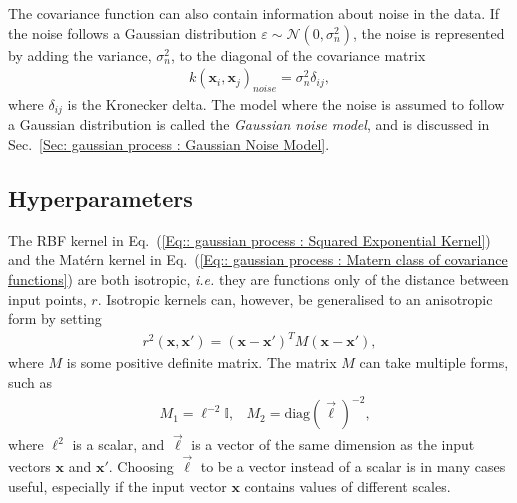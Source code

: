\documentclass[twoside,english]{uiofysmaster}
\begin{document}
{{The covariance function can also contain information about noise in the data. If the noise follows a Gaussian distribution $\varepsilon \sim \mathcal{N}(0, \sigma_n^2)$, the noise is represented by adding the variance, $\sigma_n^2$, to the diagonal of the covariance matrix
\begin{align}
k(\textbf{x}_i, \textbf{x}_j)_{noise} = \sigma^2_n \delta_{ij},
\end{align}
where $\delta_{ij}$ is the Kronecker delta. The model where the noise is assumed to follow a Gaussian distribution is called the \textit{Gaussian noise model}, and is discussed in Sec.~\ref{Sec: gaussian process : Gaussian Noise Model}. %

\subsection{Hyperparameters}\label{Sec:: gaussian process : Hyperparameters}

The RBF kernel in Eq.~(\ref{Eq:: gaussian process : Squared Exponential Kernel}) and the Mat\'{e}rn kernel in Eq.~(\ref{Eq:: gaussian process : Matern class of covariance functions}) are both isotropic, \textit{i.e.} they are functions only of the distance between input points, $r$. Isotropic kernels can, however, be generalised to an anisotropic form by setting
\begin{align}
r^2(\textbf{x}, \textbf{x}') = (\textbf{x} - \textbf{x}')^T M(\textbf{x} - \textbf{x}'),
\end{align}
where $M$ is some positive definite matrix. The matrix $M$ can take multiple forms, such as 
\begin{align}
&M_1 = \ell^{-2} \mathbb{I} , &M_2 = \text{diag}(\vec{\ell})^{-2},
\end{align}
where $\ell^2$ is a scalar, and $\vec{\ell}$ is a vector of the same dimension as the input vectors $\textbf{x}$ and $\textbf{x}'$. Choosing $\vec{\ell}$ to be a vector instead of a scalar is in many cases useful, especially if the input vector $\textbf{x}$ contains values of different scales.

}}
\end{document}
